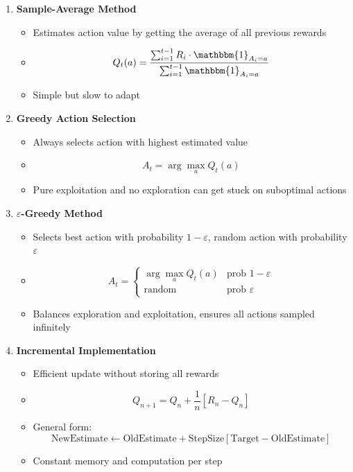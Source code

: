 \begin{enumerate}

\item \textbf{Sample-Average Method}
\begin{itemize}
\item Estimates action value by getting the average of all previous rewards
\item $$Q_t(a) = \frac{\sum_{i=1}^{t-1} R_i \cdot \mathbbm{1}_{A_i=a}}{\sum_{i=1}^{t-1} \mathbbm{1}_{A_i=a}}$$
\item Simple but slow to adapt
\end{itemize}

\item \textbf{Greedy Action Selection}
\begin{itemize}
\item Always selects action with highest estimated value
\item $$A_t = \arg\max_a Q_t(a)$$
\item Pure exploitation and no exploration can get stuck on suboptimal actions
\end{itemize}

\item \textbf{$\varepsilon$-Greedy Method}
\begin{itemize}
\item Selects best action with probability $1-\varepsilon$, random action with probability $\varepsilon$
\item $$A_t = \begin{cases} \arg\max_a Q_t(a) & \text{prob } 1-\varepsilon \\ \text{random} & \text{prob } \varepsilon \end{cases}$$
\item Balances exploration and exploitation, ensures all actions sampled infinitely
\end{itemize}

\item \textbf{Incremental Implementation}
\begin{itemize}
\item Efficient update without storing all rewards
\item $$Q_{n+1} = Q_n + \frac{1}{n}[R_n - Q_n]$$
\item General form: 
$$\text{NewEstimate} \leftarrow \text{OldEstimate} + \text{StepSize}[\text{Target} - \text{OldEstimate}]$$
\item Constant memory and computation per step
\end{itemize}


\end{enumerate}
